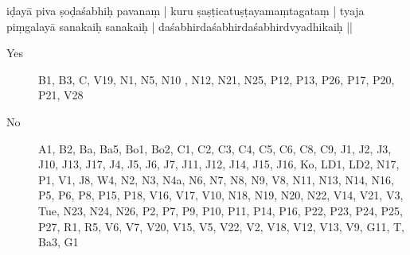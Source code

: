 \begin{ekdosis}
\begin{marma}[hp01_055]
\begin{marma}[hp02_009]
\begin{marma}[hp02_011]
iḍayā piva ṣoḍaśabhiḥ pavanaṃ |
kuru ṣaṣṭicatuṣṭayamaṃtagataṃ |
tyaja piṃgalayā sanakaiḥ sanakaiḥ |
daśabhirdaśabhirdaśabhirdvyadhikaiḥ ||
\begin{description}
\item[Yes] B1, B3, C, V19, N1, N5, N10 , N12, N21, N25, P12, P13, P26, P17, P20, P21, V28
\item[No] A1, B2, Ba, Ba5, Bo1, Bo2, C1, C2, C3, C4, C5, C6, C8, C9, J1, J2, J3, J10, J13, J17, J4, J5, J6, J7, J11, J12, J14, J15, J16, Ko, LD1, LD2, N17, P1, V1, J8, W4, N2, N3, N4a, N6, N7, N8, N9, V8, N11, N13, N14, N16, P5, P6, P8, P15, P18, V16, V17, V10, N18, N19, N20, N22, V14, V21, V3, Tue, N23, N24, N26, P2, P7, P9, P10, P11, P14, P16, P22, P23, P24, P25, P27, R1, R5, V6, V7, V20, V15, V5, V22, V2, V18, V12, V13, V9, G11, T, Ba3, G1
    \end{description}



\end{marma}
\end{marma}
\end{marma}
\end{ekdosis}
